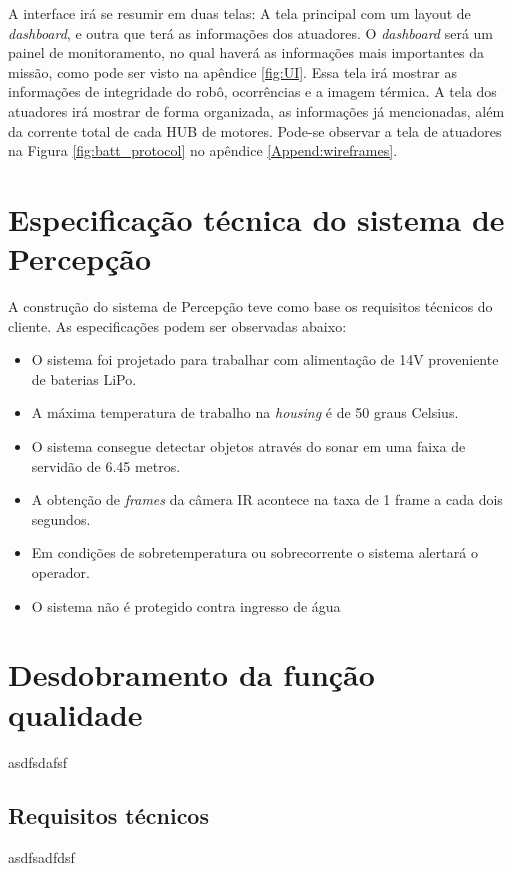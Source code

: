 A interface irá se resumir em duas telas: A tela principal com um layout de \textit{dashboard}, e outra que terá as informações dos atuadores. O \textit{dashboard} será um painel de monitoramento, no qual haverá as informações mais importantes da missão, como pode ser visto na apêndice \ref{fig:UI}. Essa tela irá mostrar as informações de integridade do robô, ocorrências e a imagem térmica. A tela dos atuadores irá mostrar de forma organizada, as informações já mencionadas, além da corrente total de cada HUB de motores. Pode-se observar a tela de atuadores na Figura \ref{fig:batt_protocol} no apêndice \ref{Append:wireframes}.


\section{Especificação técnica do sistema de Percepção}
\label{ssec:espt}

A construção do sistema de Percepção teve como base os requisitos técnicos do cliente. As especificações podem ser observadas abaixo:
\begin{itemize}
\item O sistema foi projetado para trabalhar com alimentação de 14V proveniente de baterias LiPo.
\item A máxima temperatura de trabalho na \textit{housing} é de 50 graus Celsius.
\item O sistema consegue detectar objetos através do sonar em uma faixa de servidão de 6.45 metros.
\item A obtenção de \textit{frames} da câmera IR acontece na taxa de 1 frame a cada dois segundos.
\item Em condições de sobretemperatura ou sobrecorrente o sistema alertará o operador.
\item O sistema não é protegido contra ingresso de água
\end{itemize} 


\section{Desdobramento da função qualidade}
\label{sec:qfd}
asdfsdafsf

\subsection{Requisitos técnicos}
\label{ssec:reqt}
asdfsadfdsf

